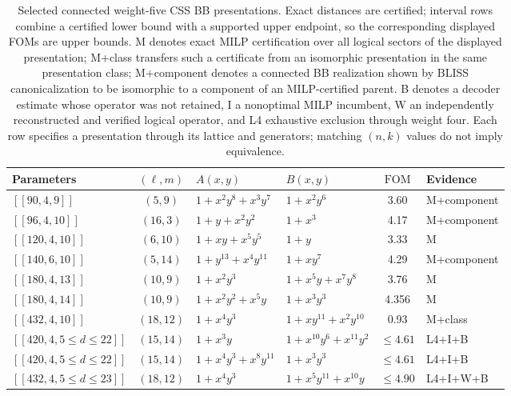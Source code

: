 \documentclass[aps,prx,twocolumn,superscriptaddress,nofootinbib,floatfix]{revtex4-2}
\newcommand{\code}[1]{\ensuremath{\left[\!\left[#1\right]\!\right]}}
\newcommand{\FOM}{\ensuremath{\mathrm{FOM}}}
\begin{document}
\begin{table}[t]
\centering
\caption{Selected connected weight-five CSS BB presentations.  Exact distances are
certified; interval rows combine a certified lower bound with a supported upper
endpoint, so the corresponding displayed FOMs are upper bounds.  M denotes exact
MILP certification over all logical sectors of the displayed presentation;
M+class transfers such a certificate from an isomorphic presentation in the
same presentation class; M+component denotes a connected BB realization
shown by BLISS canonicalization to be isomorphic to a component of an
MILP-certified parent.  B denotes a decoder estimate whose operator was not
retained, I a nonoptimal MILP incumbent, W an independently reconstructed and
verified logical operator, and L4 exhaustive exclusion through weight four.  Each row specifies
a presentation through its lattice and generators; matching $(n,k)$ values do
not imply equivalence.}
\label{tab:css}
\scriptsize
\begin{tabular}{lcllcl}
\toprule
Parameters & $(\ell,m)$ & $A(x,y)$ & $B(x,y)$ & $\FOM$ & Evidence\\
\midrule
$\code{90,4,9}$   & $(5,9)$ & $1+x^2y^8+x^3y^7$ & $1+x^2y^6$ & 3.60 & M+component\\
$\code{96,4,10}$  & $(16,3)$ & $1+y+x^2y^2$ & $1+x^3$ & 4.17 & M+component\\
$\code{120,4,10}$ & $(6,10)$ & $1+xy+x^5y^5$ & $1+y$ & 3.33 & M\\
$\code{140,6,10}$ & $(5,14)$ & $1+y^{13}+x^4y^{11}$ & $1+xy^7$ & 4.29 & M+component\\
$\code{180,4,13}$ & $(10,9)$ & $1+x^2y^3$ & $1+x^5y+x^7y^8$ & 3.76 & M\\
$\code{180,4,14}$ & $(10,9)$ & $1+x^2y^2+x^5y$ & $1+x^3y^3$ & 4.356 & M\\
$\code{432,4,10}$ & $(18,12)$ & $1+x^4y^3$ & $1+xy^{11}+x^2y^{10}$ & 0.93 & M+class\\
\midrule
$\code{420,4,5{\leq}d{\leq}22}$ & $(15,14)$ & $1+x^3y$ & $1+x^{10}y^6+x^{11}y^2$ & $\leq4.61$ & L4+I+B\\
$\code{420,4,5{\leq}d{\leq}22}$ & $(15,14)$ & $1+x^4y^3+x^8y^{11}$ & $1+x^3y^3$ & $\leq4.61$ & L4+I+B\\
$\code{432,4,5{\leq}d{\leq}23}$ & $(18,12)$ & $1+x^4y^3$ & $1+x^5y^{11}+x^{10}y$ & $\leq4.90$ & L4+I+W+B\\
\bottomrule
\end{tabular}
\end{table}
\end{document}

